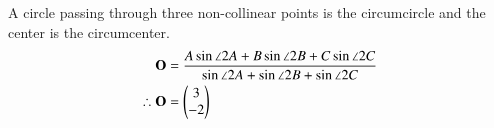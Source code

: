 \solution A circle passing through three non-collinear points is the circumcircle and the center is the circumcenter.\\
\begin{align}
\mathbf{O} &= \frac{A\sin{\angle 2A} + B\sin{\angle 2B} + C\sin{\angle 2C}}{\sin{\angle 2A} + \sin{\angle 2B} + \sin{\angle 2C}}\\
\therefore \mathbf{O} &= \begin{pmatrix}3\\-2\end{pmatrix}
\end{align}






